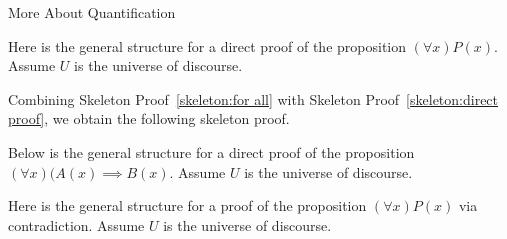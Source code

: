 \begin{section}{More About Quantification}
\begin{skeleton}\label{skeleton:for all}
Here is the general structure for a direct proof of the proposition $(\forall x)P(x)$. Assume $U$ is the universe of discourse.

\begin{center}
\end{center}
\end{skeleton}

Combining Skeleton Proof~\ref{skeleton:for all} with Skeleton Proof~\ref{skeleton:direct proof}, we obtain the following skeleton proof.

\begin{skeleton}\label{skeleton:for all direct proof}
Below is the general structure for a direct proof of the proposition $(\forall x)(A(x)\implies B(x)$. Assume $U$ is the universe of discourse.

\begin{center}
\end{center}
\end{skeleton}

\begin{skeleton}
Here is the general structure for a proof of the proposition $(\forall x)P(x)$ via contradiction. Assume $U$ is the universe of discourse.


\end{skeleton}
\end{section}
